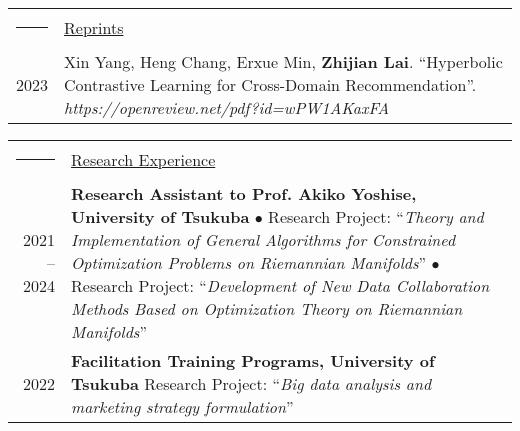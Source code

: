 \documentclass[a4paper,10pt]{article}
\newcommand{\headingfont}{\LARGE \MakeUppercase }
\newenvironment{SectionTable}[1]{
	\renewcommand*{\arraystretch}{1.0}
	\setlength{\tabcolsep}{10pt}
	\begin{longtable}{Rp{5.2in}} 
		\rule{2.3cm}{4pt} 
		& \underline{#1} \\ %
	}
	{
	\end{longtable}\vspace{-.3cm}
}
\begin{document}
\begin{SectionTable}{\headingfont Reprints} 
	2023 & 
	Xin Yang, Heng Chang, Erxue Min, \textbf{Zhijian Lai}.
	``Hyperbolic Contrastive Learning for Cross-Domain Recommendation''. \textit{https://openreview.net/pdf?id=wPW1AKaxFA} \\
	
%	
\end{SectionTable}


\begin{SectionTable}{\headingfont Research Experience}
	2021 -- 2024 & 
	\textbf{Research Assistant to Prof. Akiko Yoshise, University of Tsukuba} \newline
	$\bullet$ Research Project: ``\textit{Theory and Implementation of General Algorithms for Constrained Optimization Problems on Riemannian Manifolds}'' \newline
	$\bullet$ Research Project: ``\textit{Development of New Data Collaboration Methods Based on Optimization Theory on Riemannian Manifolds}'' \\
	
	2022 &
	\textbf{Facilitation Training Programs, University of Tsukuba}
	\newline
	Research Project: ``\textit{Big data analysis and marketing strategy formulation}''
	\newline
\end{SectionTable}
\end{document}
